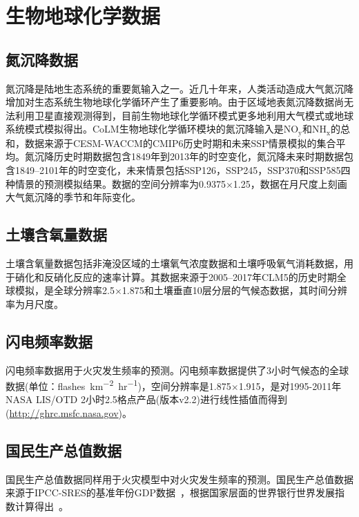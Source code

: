 \section{生物地球化学数据}

\subsection{氮沉降数据}\label{氮沉降数据}
氮沉降是陆地生态系统的重要氮输入之一。近几十年来，人类活动造成大气氮沉降增加对生态系统生物地球化学循环产生了重要影响。由于区域地表氮沉降数据尚无法利用卫星直接观测得到，目前生物地球化学循环模式更多地利用大气模式或地球系统模式模拟得出。CoLM生物地球化学循环模块的氮沉降输入是$\mathrm{NO_y}$和$\mathrm{NH_x}$的总和，数据来源于CESM-WACCM的CMIP6历史时期和未来SSP情景模拟的集合平均。氮沉降历史时期数据包含1849年到2013年的时空变化，氮沉降未来时期数据包含1849--2101年的时空变化，未来情景包括SSP126，SSP245，SSP370和SSP585四种情景的预测模拟结果。数据的空间分辨率为0.9375\textdegree$\times$1.25\textdegree，数据在月尺度上刻画大气氮沉降的季节和年际变化。


\subsection{土壤含氧量数据}\label{土壤含氧量数据}
土壤含氧量数据包括非淹没区域的土壤氧气浓度数据和土壤呼吸氧气消耗数据，用于硝化和反硝化反应的速率计算。其数据来源于2005--2017年CLM5的历史时期全球模拟，是全球分辨率2.5\textdegree$\times$1.875\textdegree 和土壤垂直10层分层的气候态数据，其时间分辨率为月尺度。


\subsection{闪电频率数据}\label{闪电频率数据}
闪电频率数据用于火灾发生频率的预测。闪电频率数据提供了3小时气候态的全球数据(单位：\unit{flashes. km^{-2} hr^{-1}})，空间分辨率是1.875\textdegree$\times$1.915\textdegree，是对1995-2011年NASA LIS/OTD 2小时2.5\textdegree{}格点产品(版本v2.2)进行线性插值而得到(\url{http://ghrc.msfc.nasa.gov})。 


\subsection{国民生产总值数据}\label{国民生产总值数据}
国民生产总值数据同样用于火灾模型中对火灾发生频率的预测。国民生产总值数据来源于IPCC-SRES的基准年份GDP数据~\citep{van2007downscaling}，根据国家层面的世界银行世界发展指数计算得出~\citep{WorldBank2004,UNSTAT2005}。


